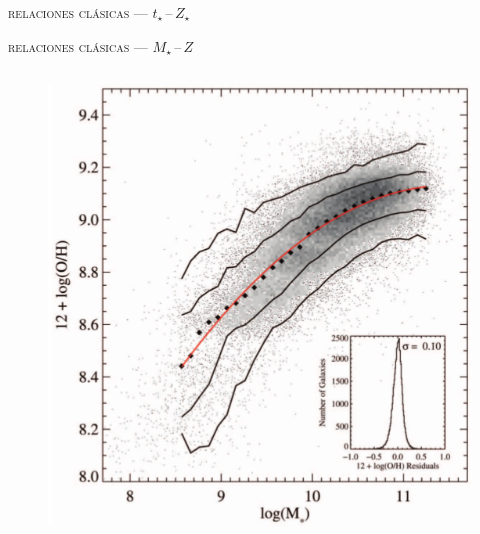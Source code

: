 \documentclass[xcolor=dvipsnames,4pt,hyperref={colorlinks,citecolor=black,linkcolor=black,urlcolor=black}]{beamer}
\begin{document}
\begin{frame}{\textsc{relaciones clásicas --- $t_\star\,$--$\,Z_\star$}}

\end{frame}

\begin{frame}{\textsc{relaciones clásicas --- $M_\star\,$--$\,Z$}}

\begin{columns}
\begin{figure}
\includegraphics[scale=0.7]{img/tremonti2004-6}
\end{figure}
\end{columns}
\end{frame}
\end{document}

